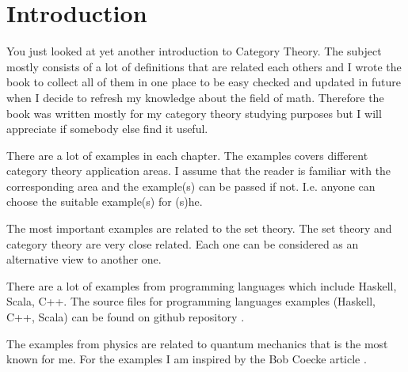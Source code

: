 \chapter*{Introduction}

You just looked at yet another introduction to Category Theory. The
subject mostly consists of a lot of definitions that are related each
others and I wrote the book to collect all of them in one
place to be easy checked and updated in future when I decide to refresh
my knowledge about the field of math. Therefore the book was written mostly
for my category theory studying 
purposes but I will appreciate if somebody else find it useful.

There are a lot of 
examples in each chapter. The examples covers different category
theory application areas. I assume that the reader is familiar with
the corresponding area and the example(s) can be passed if not. I.e.
anyone can choose the suitable example(s) for (s)he. 

The most important examples are related to the set theory. The set
theory and category theory are very close related. Each one can be
considered as an alternative view to another one.

There are a lot of examples from programming languages which include
Haskell, Scala, C++. The source files for programming languages 
examples (Haskell, C++, Scala) can be found on github repository
\cite{bib:github:ivanmurashko}.  

The examples from physics are related to quantum mechanics that is the
most known for me. For the examples I am inspired by the Bob Coecke
article \cite{bib:arxiv:Bob_Coecke_2008}.




